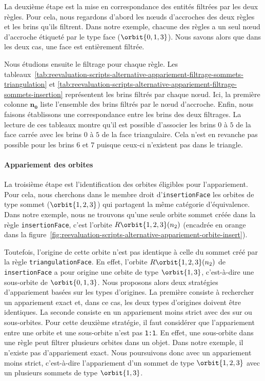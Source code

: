 La deuxième étape est la mise en correspondance des entités filtrées par les
deux règles. %
Pour cela, nous regardons d'abord les n\oe uds d'accroches des deux règles et
les brins qu'ils filtrent. %
Dans notre exemple, chacune des règles a un seul n\oe ud d'accroche étiqueté par
le type face (\(\orbit{0,1,3}\)). %
Nous savons alors que dans les deux cas, une face est entièrement filtrée. %

Nous étudions ensuite le filtrage pour chaque règle. %
Les
tableaux~\ref{tab:reevaluation-scripts-alternative-appariement-filtrage-sommets-triangulation}
et
\ref{tab:reevaluation-scripts-alternative-appariement-filtrage-sommets-insertion}
représentent les brins filtrés par chaque n\oe ud. %
Ici, la première colonne \(\mathbf{n_{0}}\) liste l'ensemble des brins filtrés
par le n\oe ud d'accroche. %
Enfin, nous faisons établissons une correspondance entre les brins des deux
filtrages. %
La lecture de ces tableaux montre qu'il est possible d'associer les brins \(0\)
à \(5\) de la face carrée avec les brins \(0\) à \(5\) de la face
triangulaire. %
Cela n'est en revanche pas possible pour les brins \(6\) et \(7\) puisque
ceux-ci n'existent pas dans le triangle. %



\paragraph{Appariement des orbites}



La troisième étape est l'identification des orbites éligibles pour
l'appariement. %
Pour cela, nous cherchons dans le membre droit d'\texttt{insertion\-Face} les
orbites de type sommet (\(\orbit{1,2,3}\)) qui partagent la même catégorie
d'équivalence. %
Dans notre exemple, nous ne trouvons qu'une seule orbite sommet créée dans la
règle \texttt{insertion\-Face}, c'est l'orbite \(R\orbit{1,2,3}(n_{2})\)
(encadrée en \textcolor{mydarkorange}{orange} dans la
figure~\ref{fig:reevaluation-scripts-alternative-appariement-orbite-insert}). %

Toutefois, l'origine de cette orbite n'est pas identique à celle du sommet créé
par la règle \texttt{triangulation\-Face}. %
En effet, l'orbite \(R\orbit{1,2,3}(n_{2})\) de \texttt{insertion\-Face} a pour
origine une orbite de type \(\orbit{1,3}\), c'est-à-dire une sous-orbite de
\(\orbit{0,1,3}\). %
Nous proposons alors deux stratégies d'appariement basées sur les types
d'origines. %
La première consiste à rechercher un appariement exact et, dans ce cas, les deux
types d'origines doivent être identiques. %
La seconde consiste en un appariement moins strict avec des sur ou
sous-orbites. %
Pour cette deuxième stratégie, il faut considérer que l'appariement entre une
orbite et une sous-orbite n'est pas \texttt{1:1}. %
En effet, une sous-orbite dans une règle peut filtrer plusieurs orbites dans un
objet. %
Dans notre exemple, il n'existe pas d'appariement exact. %
Nous poursuivons donc avec un appariement moins strict, c'est-à-dire
l'appariement d'un sommet de type \(\orbit{1,2,3}\) avec un plusieurs sommets de
type \(\orbit{1,3}\). %



